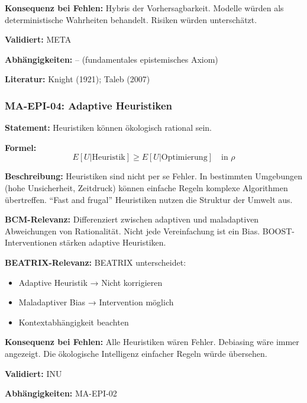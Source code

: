 \textbf{Konsequenz bei Fehlen:}
Hybris der Vorhersagbarkeit. Modelle würden als deterministische Wahrheiten behandelt. Risiken würden unterschätzt.

\textbf{Validiert:} META

\textbf{Abhängigkeiten:} -- (fundamentales epistemisches Axiom)

\textbf{Literatur:} Knight (1921); Taleb (2007)


\subsubsection*{MA-EPI-04: Adaptive Heuristiken}

\textbf{Statement:} Heuristiken können ökologisch rational sein.

\textbf{Formel:}
\begin{equation}
E[U|\text{Heuristik}] \geq E[U|\text{Optimierung}] \quad \text{in } \rho
\end{equation}

\textbf{Beschreibung:}
Heuristiken sind nicht per se Fehler. In bestimmten Umgebungen (hohe Unsicherheit, Zeitdruck) können einfache Regeln komplexe Algorithmen übertreffen. ``Fast and frugal'' Heuristiken nutzen die Struktur der Umwelt aus.

\textbf{BCM-Relevanz:}
Differenziert zwischen adaptiven und maladaptiven Abweichungen von Rationalität. Nicht jede Vereinfachung ist ein Bias. BOOST-Interventionen stärken adaptive Heuristiken.

\textbf{BEATRIX-Relevanz:}
BEATRIX unterscheidet:
\begin{itemize}
    \item Adaptive Heuristik → Nicht korrigieren
    \item Maladaptiver Bias → Intervention möglich
    \item Kontextabhängigkeit beachten
\end{itemize}

\textbf{Konsequenz bei Fehlen:}
Alle Heuristiken wären Fehler. Debiasing wäre immer angezeigt. Die ökologische Intelligenz einfacher Regeln würde übersehen.

\textbf{Validiert:} INU

\textbf{Abhängigkeiten:} MA-EPI-02

